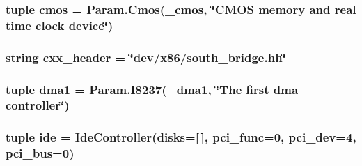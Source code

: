 \label{classSouthBridge_1_1SouthBridge_a27a2224d5923719babfd130a76f9e10c}
\hypertarget{classSouthBridge_1_1SouthBridge_ab5666bd6ecb7df81d23c2fc3f545c7fc}{
\subsubsection[{cmos}]{\setlength{\rightskip}{0pt plus 5cm}tuple {\bf cmos} = Param.Cmos({\bf \_\-cmos}, \char`\"{}CMOS memory and real time clock device\char`\"{})}}
\label{classSouthBridge_1_1SouthBridge_ab5666bd6ecb7df81d23c2fc3f545c7fc}
\hypertarget{classSouthBridge_1_1SouthBridge_a17da7064bc5c518791f0c891eff05fda}{
\subsubsection[{cxx\_\-header}]{\setlength{\rightskip}{0pt plus 5cm}string {\bf cxx\_\-header} = \char`\"{}dev/x86/south\_\-bridge.hh\char`\"{}}}
\label{classSouthBridge_1_1SouthBridge_a17da7064bc5c518791f0c891eff05fda}
\hypertarget{classSouthBridge_1_1SouthBridge_ad47592c271ed33e6ee6d55f08e27e774}{
\subsubsection[{dma1}]{\setlength{\rightskip}{0pt plus 5cm}tuple {\bf dma1} = Param.I8237({\bf \_\-dma1}, \char`\"{}The first dma controller\char`\"{})}}
\label{classSouthBridge_1_1SouthBridge_ad47592c271ed33e6ee6d55f08e27e774}
\hypertarget{classSouthBridge_1_1SouthBridge_aca6e0ef87c4d6a0425503849acb9d173}{
\subsubsection[{ide}]{\setlength{\rightskip}{0pt plus 5cm}tuple {\bf ide} = {\bf IdeController}(disks=\mbox{[}$\,$\mbox{]}, pci\_\-func=0, pci\_\-dev=4, pci\_\-bus=0)}}
